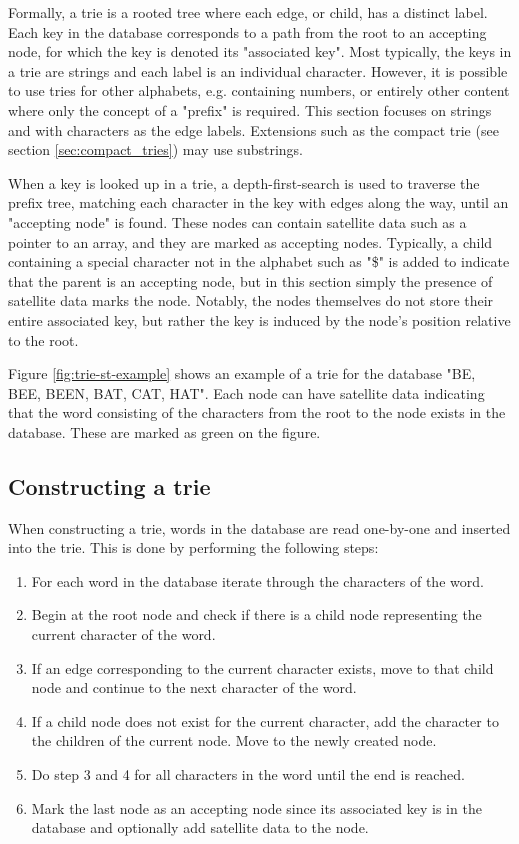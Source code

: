 Formally, a trie is a rooted tree where each edge, or child, has a distinct label. Each key in the database corresponds to a path from the root to an accepting node, for which the key is denoted its "associated key". Most typically, the keys in a trie are strings and each label is an individual character. However, it is possible to use tries for other alphabets, e.g. containing numbers, or entirely other content where only the concept of a "prefix" is required. This section focuses on strings and with characters as the edge labels. Extensions such as the compact trie (see section \ref{sec:compact_tries}) may use substrings. 

When a key is looked up in a trie, a depth-first-search is used to traverse the prefix tree, matching each character in the key with edges along the way, until an "accepting node" is found. These nodes can contain satellite data such as a pointer to an array, and they are marked as accepting nodes. Typically, a child containing a special character not in the alphabet such as "\$" is added to indicate that the parent is an accepting node, but in this section simply the presence of satellite data marks the node. Notably, the nodes themselves do not store their entire associated key, but rather the key is induced by the node's position relative to the root. 

Figure \ref{fig:trie-st-example} shows an example of a trie for the database "BE, BEE, BEEN, BAT, CAT, HAT". Each node can have satellite data indicating that the word consisting of the characters from the root to the node exists in the database. These are marked as green on the figure. 

\subsection{Constructing a trie} \label{sec:Constructiontire}

When constructing a trie, words in the database are read one-by-one and inserted into the trie. This is done by performing the following steps:

\begin{enumerate}
  \item For each word in the database iterate through the characters of the word.
  \item Begin at the root node and check if there is a child node representing the current character of the word. 
  \item If an edge corresponding to the current character exists, move to that child node and continue to the next character of the word.
  \item If a child node does not exist for the current character, add the character to the children of the current node. Move to the newly created node.
  \item Do step 3 and 4 for all characters in the word until the end is reached. 
  \item Mark the last node as an accepting node since its associated key is in the database and optionally add satellite data to the node. 
\end{enumerate}

